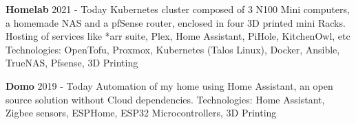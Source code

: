 

\begin{cventries}

  \cvproject
    {\textbf{Homelab}} %
    {2021 - Today} %
    {
      Kubernetes cluster composed of 3 N100 Mini computers, a homemade NAS and a pfSense router, enclosed in four 3D printed mini Racks. \newline
      Hosting of services like *arr suite, Plex, Home Assistant, PiHole, KitchenOwl, etc
    }
    {Technologies: OpenTofu, Proxmox, Kubernetes (Talos Linux), Docker, Ansible, TrueNAS, Pfsense, 3D Printing}

  \cvproject
    {\textbf{Domo}} %
    {2019 - Today} %
    {
      Automation of my home using Home Assistant, an open source solution without Cloud dependencies.
    }
    {Technologies: Home Assistant, Zigbee sensors, ESPHome, ESP32 Microcontrollers, 3D Printing}

\end{cventries}
